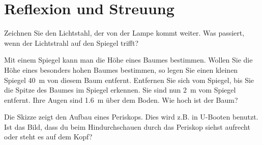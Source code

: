 \documentclass[12pt,a4paper,twoside]{article}
\begin{document}
\newpage
\section{Reflexion und Streuung}


\begin{aufgabe}
Zeichnen Sie den Lichtstahl, der von der Lampe kommt weiter. Was passiert, wenn der Lichtstrahl auf den Spiegel trifft?	

\end{aufgabe}

\begin{aufgabe}
	Mit einem Spiegel kann man die Höhe eines Baumes bestimmen. Wollen Sie die Höhe eines besonders hohen Baumes bestimmen,
	so legen Sie einen kleinen Spiegel \SI{40}{m} von diesem Baum entfernt. Entfernen Sie sich vom Spiegel, bis Sie die
	Spitze des Baumes im Spiegel erkennen. Sie sind nun \SI{2}{m} vom Spiegel entfernt. Ihre Augen sind \SI{1.6}{m} über dem Boden.
	Wie hoch ist der Baum?
\end{aufgabe}

\begin{minipage}{0.5\textwidth}
\begin{aufgabe}
	Die Skizze zeigt den Aufbau eines Periskops. Dies wird z.B. in U-Booten benutzt. Ist das Bild, dass du beim Hindurchschauen
	durch das Periskop siehst aufrecht oder steht es auf dem Kopf?
\end{aufgabe}
\end{minipage}
\begin{minipage}{0.5\textwidth}

\end{minipage}
\end{document}
